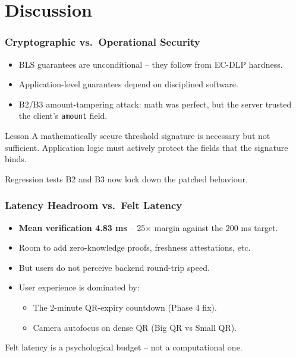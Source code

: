 \documentclass{beamer}
\newcommand{\HL}[1]{\textcolor{emphasis}{#1}}
\begin{document}
\section{Discussion}

\begin{frame}
  \frametitle{Cryptographic vs.\ Operational Security}
  \begin{itemize}
      \item BLS guarantees are \HL{unconditional} -- they follow from EC-DLP hardness.
      \item Application-level guarantees depend on \HL{disciplined software}.
      \item B2/B3 amount-tampering attack: math was perfect, but the server trusted the client's \texttt{amount} field.
  \end{itemize}
  \vspace{0.15cm}
  \begin{block}{Lesson}
    A mathematically secure threshold signature is \HL{necessary but not sufficient}. Application logic must actively protect the fields that the signature binds.
  \end{block}
  \vspace{0.1cm}
  Regression tests B2 and B3 now lock down the patched behaviour.
\end{frame}

\begin{frame}
  \frametitle{Latency Headroom vs.\ Felt Latency}
  \begin{itemize}
      \item \textbf{Mean verification 4.83 ms} -- 25$\times$ margin against the 200 ms target.
      \item Room to add zero-knowledge proofs, freshness attestations, etc.
      \item But \HL{users do not perceive backend round-trip speed}.
      \item User experience is dominated by:
        \begin{itemize}
          \item The 2-minute QR-expiry countdown (Phase 4 fix).
          \item Camera autofocus on dense QR (Big QR vs Small QR).
        \end{itemize}
  \end{itemize}
  \vspace{0.15cm}
  \HL{Felt latency} is a psychological budget -- not a computational one.
\end{frame}
\end{document}
